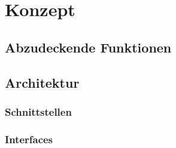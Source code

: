 \chapter{Konzept}
\section{Abzudeckende Funktionen}
\section{Architektur}
\subsection{Schnittstellen}
\subsection{Interfaces}
